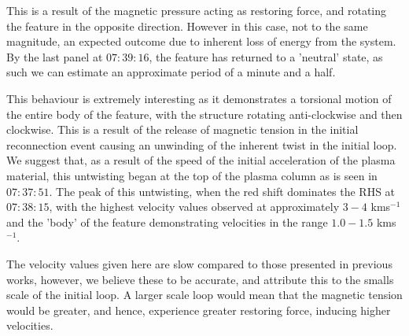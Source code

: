 This is a result of the magnetic pressure acting as restoring force, and rotating the feature in the opposite direction. 
However in this case, not to the same magnitude, an expected outcome due to inherent loss of energy from the system.
By the last panel at $07:39:16$, the feature has returned to a 'neutral' state, as such we can estimate an approximate period of a minute and a half.

This behaviour is extremely interesting as it demonstrates a torsional motion of the entire body of the feature, with the structure rotating anti-clockwise and then clockwise.
This is a result of the release of magnetic tension in the initial reconnection event causing an unwinding of the inherent twist in the initial loop.
We suggest that, as a result of the speed of the initial acceleration of the plasma material, this untwisting began at the top of the plasma column as is seen in $07:37:51$.
The peak of this untwisting, when the red shift dominates the RHS at $07:38:15$, with the highest velocity values observed at approximately $3-4$ kms${^{-1}}$ and the 'body' of the feature demonstrating velocities in the range $1.0-1.5$ kms${^{-1}}$.

The velocity values given here are slow compared to those presented in previous works, however, we believe these to be accurate, and attribute this to the smalls scale of the initial loop.
A larger scale loop would mean that the magnetic tension would be greater, and hence, experience greater restoring force, inducing higher velocities.

  




